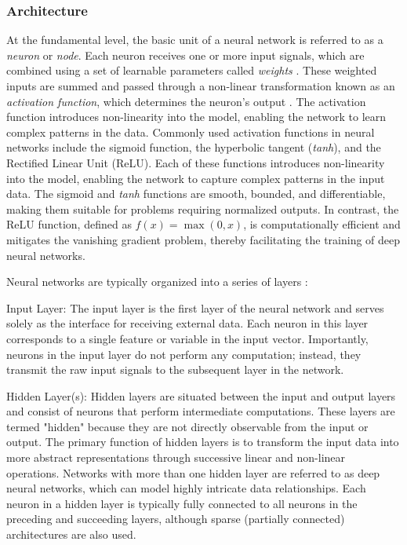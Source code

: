 \subsubsection{Architecture}
At the fundamental level, the basic unit of a neural network is referred to as a \textit{neuron} or \textit{node}. Each neuron receives one or more input signals, which are combined using a set of learnable parameters called \textit{weights} \parencite[p.~4]{mienye2024nncomprehensivereview}. These weighted inputs are summed and passed through a non-linear transformation known as an \textit{activation function}, which determines the neuron's output \parencite[pp.~4--5]{mienye2024nncomprehensivereview}. The activation function introduces non-linearity into the model, enabling the network to learn complex patterns in the data. Commonly used activation functions in neural networks include the sigmoid function, the hyperbolic tangent (\textit{tanh}), and the Rectified Linear Unit (ReLU). Each of these functions introduces non-linearity into the model, enabling the network to capture complex patterns in the input data. The sigmoid and \textit{tanh} functions are smooth, bounded, and differentiable, making them suitable for problems requiring normalized outputs. In contrast, the ReLU function, defined as $f(x) = \max(0, x)$, is computationally efficient and mitigates the vanishing gradient problem, thereby facilitating the training of deep neural networks.

Neural networks are typically organized into a series of layers \parencite[p.~4]{mienye2024nncomprehensivereview}:

Input Layer: The input layer is the first layer of the neural network and serves solely as the interface for receiving external data. Each neuron in this layer corresponds to a single feature or variable in the input vector. Importantly, neurons in the input layer do not perform any computation; instead, they transmit the raw input signals to the subsequent layer in the network.

Hidden Layer(s): Hidden layers are situated between the input and output layers and consist of neurons that perform intermediate computations. These layers are termed "hidden" because they are not directly observable from the input or output. The primary function of hidden layers is to transform the input data into more abstract representations through successive linear and non-linear operations. Networks with more than one hidden layer are referred to as deep neural networks, which can model highly intricate data relationships. Each neuron in a hidden layer is typically fully connected to all neurons in the preceding and succeeding layers, although sparse (partially connected) architectures are also used.

